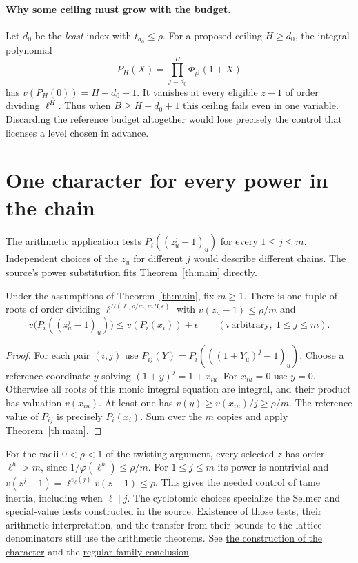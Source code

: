 \documentclass[11pt]{article}
\newcommand{\src}[3]{\href{https://github.com/lsernau/grh-lean/blob/72fead102f663d5c7a407964a13dc0cf9d977207/grh/src/#1.lean\#L#2}{#3}}
\newcommand{\gensrc}[2]{\src{New/Congruences/Selmer/GeneralTheorem}{#1}{#2}}
\begin{document}
\paragraph{Why some ceiling must grow with the budget.} Let $d_0$ be the \emph{least} index with $t_{d_0}\le\rho$. For a proposed ceiling $H\ge d_0$, the integral polynomial
\[
           P_H(X)=\prod_{j=d_0}^{H}\Phi_{\ell^j}(1+X)
\]
has $v(P_H(0))=H-d_0+1$. It vanishes at every eligible $z-1$ of order dividing $\ell^H$. Thus when $B\ge H-d_0+1$ this ceiling fails even in one variable. Discarding the reference budget altogether would lose precisely the control that licenses a level chosen in advance.
\newpage
\section{One character for every power in the chain}\label{sec:powers}
The arithmetic application tests $P_i((z_u^j-1)_u)$ for every $1\le j\le m$. Independent choices of the $z_u$ for different $j$ would describe different chains. The source's \gensrc{325}{power substitution} fits Theorem~\ref{th:main} directly.
\begin{corollary}\label{cor:power}
Under the assumptions of Theorem~\ref{th:main}, fix $m\ge1$. There is one tuple of roots of order dividing $\ell^{H(\ell,\rho/m,mB,\epsilon)}$ with $v(z_u-1)\le\rho/m$ and
\[
 v\bigl(P_i((z_u^j-1)_u)\bigr)\le v(P_i(x_i))+\epsilon
       \qquad(i\ \text{arbitrary},\ 1\le j\le m).
\]
\end{corollary}
\begin{proof}
For each pair $(i,j)$ use $P_{ij}(Y)=P_i(((1+Y_u)^j-1)_u)$. Choose a reference coordinate $y$ solving $(1+y)^j=1+x_{iu}$. For $x_{iu}=0$ use $y=0$. Otherwise all roots of this monic integral equation are integral, and their product has valuation $v(x_{iu})$. At least one has $v(y)\ge v(x_{iu})/j\ge\rho/m$. The reference value of $P_{ij}$ is precisely $P_i(x_i)$. Sum over the $m$ copies and apply Theorem~\ref{th:main}.
\end{proof}
For the radii $0<\rho<1$ of the twisting argument, every selected $z$ has order $\ell^h>m$, since $1/\varphi(\ell^h)\le\rho/m$. For $1\le j\le m$ its power is nontrivial and $v(z^j-1)=\ell^{v_\ell(j)}v(z-1)\le\rho$. This gives the needed control of tame inertia, including when $\ell\mid j$. The cyclotomic choices specialize the Selmer and special-value tests constructed in the source. Existence of those tests, their arithmetic interpretation, and the transfer from their bounds to the lattice denominators still use the arithmetic theorems. See \gensrc{392}{the construction of the character} and the \src{New/Congruences/FitTwistsExist}{517}{regular-family conclusion}.
\end{document}
